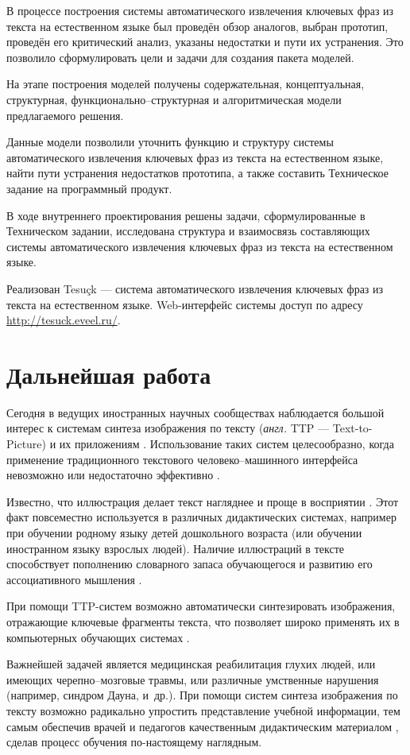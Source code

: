 \Conclusion
В процессе построения системы автоматического извлечения
ключевых фраз из текста на естественном языке был проведён
обзор аналогов, выбран прототип, проведён его критический анализ,
указаны недостатки и пути их устранения. Это позволило сформулировать
цели и задачи для создания пакета моделей.

На этапе построения моделей получены содержательная, концептуальная,
структурная, функционально--структурная и алгоритмическая модели
предлагаемого решения.

Данные модели позволили уточнить функцию и структуру системы
автоматического извлечения ключевых фраз из текста на естественном
языке, найти пути устранения недостатков прототипа, а также
составить Техническое задание на программный продукт.

В ходе внутреннего проектирования решены задачи,
сформулированные в Техническом задании, исследована
структура и взаимосвязь составляющих системы автоматического
извлечения ключевых фраз из текста на естественном языке.

Реализован Tesuçk — система автоматического извлечения ключевых
фраз из текста на естественном языке. Web-интерфейс системы
доступ по адресу \url{http://tesuck.eveel.ru/}.

\section*{Дальнейшая работа}
Сегодня в ведущих иностранных научных сообществах
наблюдается большой интерес к системам синтеза изображения по
тексту (\emph{англ.} TTP — Text-to-Picture) и их приложениям
\cite{Goldberg09,Mihalcea08,Zhu07}. Использование таких систем
целесообразно, когда применение традиционного текстового
человеко--машинного интерфейса невозможно или недостаточно
эффективно \cite{Mihalcea08}.

Известно, что иллюстрация делает текст нагляднее и проще в
восприятии \cite{Zhu07}. Этот факт повсеместно используется
в различных дидактических системах, например при обучении
родному языку детей дошкольного возраста (или обучении
иностранном языку взрослых людей). Наличие иллюстраций в
тексте способствует пополнению словарного запаса обучающегося и
развитию его ассоциативного мышления \cite{Yoshii02}.

При помощи TTP-систем возможно автоматически синтезировать
изображения, отражающие ключевые фрагменты текста,
что позволяет широко применять их в компьютерных обучающих
системах \cite{Zhu07}.

Важнейшей задачей является медицинская реабилитация глухих людей,
или имеющих черепно--мозговые травмы, или различные умственные
нарушения \cite{Goldberg09} (например, синдром Дауна, и\ др.).
При помощи систем синтеза изображения по тексту возможно радикально
упростить представление учебной информации, тем самым обеспечив
врачей и педагогов качественным дидактическим материалом
\cite{Mihalcea08,Yoshii02}, сделав процесс обучения по-настоящему
наглядным.

